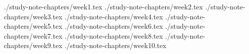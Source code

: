 \documentclass[10pt,a4paper,oneside]{report}
\begin{document}
\maketitle

\setcounter{tocdepth}{5}
\tableofcontents

 {./study-note-chapters/week1.tex}
 {./study-note-chapters/week2.tex}
 {./study-note-chapters/week3.tex}
 {./study-note-chapters/week4.tex}
 {./study-note-chapters/week5.tex}
 {./study-note-chapters/week6.tex}
 {./study-note-chapters/week7.tex}
 {./study-note-chapters/week8.tex}
 {./study-note-chapters/week9.tex}
 {./study-note-chapters/week10.tex}
\end{document}
